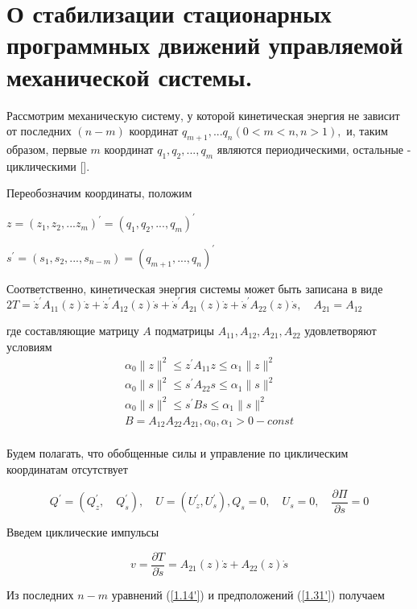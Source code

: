 \section{О стабилизации стационарных программных движений управляемой механической системы.} \label{p13}

Рассмотрим механическую систему, у которой кинетическая энергия не зависит от последних $(n-m)$ координат $q_{m+1},... q_n (0 < m < n, n > 1),$ и, таким образом, первые $m$ координат $q_1, q_2, ... , q_m$ являются периодическими, остальные - циклическими [].

Переобозначим координаты, положим

$z = (z_1, z_2, ... z_m)^{'} = (q_1, q_2, ..., q_m)^{'}$

$s^{'} = (s_1, s_2, ... , s_{n-m}) = (q_{m + 1}, ..., q_n)^{'}$

Соответственно, кинетическая энергия системы может быть записана в виде $2T = \dot z^{'} A_{11} (z) \dot z + \dot z^{'} A_{12} (z) \dot s + \dot s^{'} A_{21} (z) \dot z + \dot s^{'} A_{22} (z) \dot s, \quad A_{21} = A_{12}$

где составляющие матрицу $A$ подматрицы $A_{11}, A_{12}, A_{21}, A_{22}$ удовлетворяют условиям 
$$
\begin{array}{l}
\alpha_0 \| z \|^2 \le z^{'} A_{11} z \le \alpha_1  \| z \|^2\\
\alpha_0 \| s \|^2 \le s^{'} A_{22} s \le \alpha_1  \| s \|^2\\
\alpha_0 \| s \|^2 \le s^{'} B s \le \alpha_1  \| s \|^2\\
B = A_{12} A_{22} A_{21}, \alpha_0, \alpha_1 > 0 - const\\
\end{array}
$$

Будем полагать, что обобщенные силы и управление по циклическим координатам отсутствует

\begin{equation} \label{1.31'}
Q^{'} = (Q_{z}^{'}, \quad Q_{s}^{'}), \quad U = (U_{z}^{'}, U_{s}^{'}), Q_s = 0, \quad U_s = 0, \quad \frac{\partial \Pi}{\partial s} = 0
\end{equation}

Введем циклические импульсы

\begin{equation} \label{1.32'}
v = \frac{\partial T}{\partial \dot s} = A_{21} (z) \dot z + A_{22} (z) \dot s
\end{equation}

Из последних $n - m$ уравнений (\ref{1.14'}) и предположений (\ref{1.31'}) получаем 

